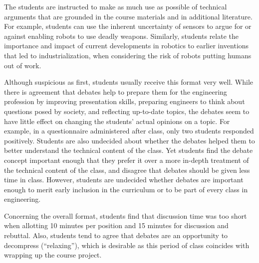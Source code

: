\documentclass[paper=6.14in:9.21in,pagesize=pdftex,11pt,twoside,openright]{scrbook}
\begin{document}
The students are instructed to make as much use as possible of technical arguments that are grounded in the course materials and in additional literature. For example, students can use the inherent uncertainty of sensors to argue for or against enabling robots to use deadly weapons. Similarly, students relate the importance and impact of current developments in robotics to earlier inventions that led to industrialization, when considering the risk of robots putting humans out of work. 

Although suspicious as first, students usually receive this format very well.  While there is agreement that debates help to prepare them for the engineering profession by improving presentation skills, preparing engineers to think about questions posed by society, and reflecting up-to-date topics, the debates seem to have little effect on changing the students' actual opinions on a topic. For example, in a questionnaire administered after class, only two students responded positively. Students are also undecided about whether the debates helped them to better understand the technical content of the class. Yet students find the debate concept important enough that they prefer it over a more in-depth treatment of the technical content of the class, and disagree that debates should be given less time in class. However, students are undecided whether debates are important enough to merit early inclusion in the curriculum or to be part of every class in engineering. 

Concerning the overall format, students find that discussion time was too short when allotting 10 minutes per position and 15 minutes for discussion and rebuttal. Also, students tend to agree that debates are an opportunity to decompress (``relaxing''), which is desirable as this period of class coincides with wrapping up the course project.




\printindex
\end{document}
